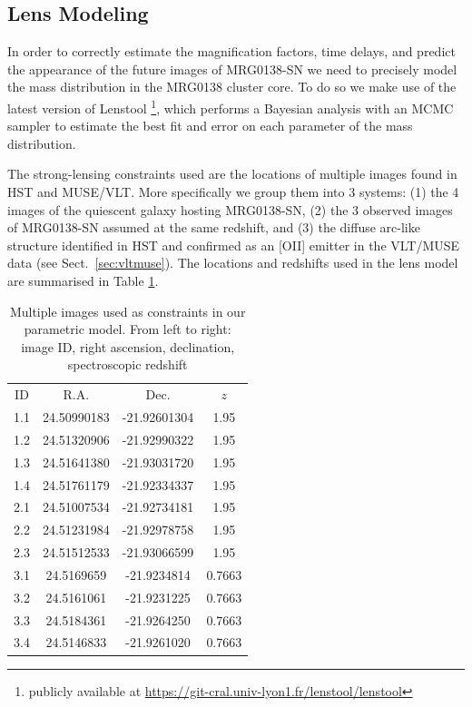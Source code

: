 \documentclass[12pt,dvipsnames]{article}
\begin{document}
\subsection*{Lens Modeling}

In order to correctly estimate the magnification factors, time delays, and predict the appearance of the future images of MRG0138-SN we need to precisely model the mass distribution in the MRG0138 cluster core. To do so we make use of the latest version of Lenstool \cite{jullo_bayesian_2007}\footnote{publicly available at \url{ https://git-cral.univ-lyon1.fr/lenstool/lenstool}}, which performs a Bayesian analysis with an MCMC sampler to estimate the best fit and error on each parameter of the mass distribution. 

The strong-lensing constraints used are the locations of multiple images found in HST and MUSE/VLT. More specifically we group them into 3 systems: (1) the 4 images of the quiescent galaxy hosting MRG0138-SN, (2) the 3 observed images of MRG0138-SN assumed at the same redshift, and (3) the diffuse arc-like structure identified in HST and confirmed as an [OII] emitter in the VLT/MUSE data (see Sect.~\ref{sec:vltmuse}). The locations and redshifts used in the lens model are summarised in Table \ref{tab:mulimages}.

\begin{table}[]
    \centering
    \begin{tabular}{c|c|c|c}
     ID &   R.A. & Dec. & $z$ \\
1.1 & 24.50990183 & -21.92601304 & 1.95 \\
1.2 & 24.51320906 & -21.92990322 & 1.95 \\
1.3 & 24.51641380 & -21.93031720 & 1.95 \\
1.4 & 24.51761179 & -21.92334337 & 1.95 \\
2.1 & 24.51007534 & -21.92734181 & 1.95 \\
2.2 & 24.51231984 & -21.92978758 & 1.95 \\
2.3 & 24.51512533 & -21.93066599 & 1.95 \\
3.1 & 24.5169659 & -21.9234814 & 0.7663 \\
3.2 & 24.5161061 & -21.9231225 & 0.7663 \\
3.3 & 24.5184361 & -21.9264250 & 0.7663 \\
3.4 & 24.5146833 & -21.9261020 & 0.7663 \\
    \end{tabular}
    \caption{Multiple images used as constraints in our parametric model. From left to right: image ID, right ascension, declination, spectroscopic redshift}
    \label{tab:mulimages}
\end{table}
\end{document}
